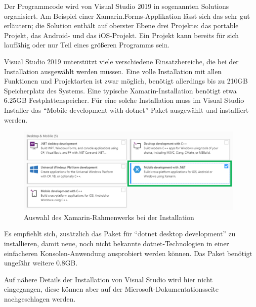 Der Programmcode wird von Visual Studio 2019 in sogenannten Solutions organisiert.
Am Beispiel einer Xamarin.Forms-Applikation lässt sich das sehr gut erläutern;
die Solution enthält auf oberster Ebene drei Projekte: das portable Projekt, das Android- und das iOS-Projekt.
Ein Projekt kann bereits für sich lauffähig oder nur Teil eines größeren Programms sein.\par

Visual Studio 2019 unterstützt viele verschiedene Einsatzbereiche, die bei der Installation ausgewählt werden müssen.
Eine volle Installation mit allen Funktionen und Projektarten ist zwar möglich, benötigt allerdings bis zu 210GB Speicherplatz des Systems.
Eine typische Xamarin-Installation benötigt etwa 6.25GB Festplattenspeicher.
Für eine solche Installation muss im Visual Studio Installer das \enquote{Mobile development with \acs{dotnet}}-Paket ausgewählt und installiert werden.
\begin{figure}[H]
    \centering\includegraphics[width=0.9\linewidth]{images/auswahl_rahmenwerk/installation.png}    
    \caption{Auswahl des Xamarin-Rahmenwerks bei der Installation}
\end{figure}
Es empfiehlt sich, zusätzlich das Paket für \enquote{\acs{dotnet} desktop development} zu installieren, damit neue, noch nicht bekannte \ac{dotnet}-Technologien in einer einfacheren Konsolen-Anwen\-dung ausprobiert werden können.
Das Paket benötigt ungefähr weitere 0.8GB.\par
Auf nähere Details der Installation von Visual Studio wird hier nicht eingegangen, diese können aber auf der Microsoft-Dokumentationsseite \cite[vgl.][]{msdoc-vs-install} nachgeschlagen werden.
%
